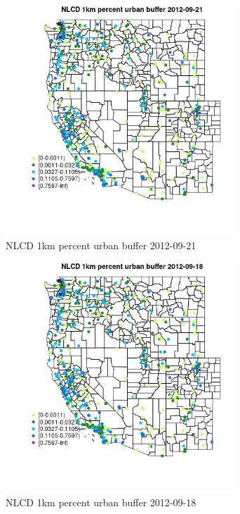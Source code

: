 \begin{figure} 
\centering  
\includegraphics[width=0.77\textwidth]{Code_Outputs/Report_ML_input_PM25_Step4_part_e_de_duplicated_aves_compiled_2019-05-14wNAs_MapObsNLCD_1km_percent_urban_buffer2012-09-21.jpg} 
\caption{\label{fig:Report_ML_input_PM25_Step4_part_e_de_duplicated_aves_compiled_2019-05-14wNAsMapObsNLCD_1km_percent_urban_buffer2012-09-21}NLCD 1km percent urban buffer 2012-09-21} 
\end{figure} 
 

\begin{figure} 
\centering  
\includegraphics[width=0.77\textwidth]{Code_Outputs/Report_ML_input_PM25_Step4_part_e_de_duplicated_aves_compiled_2019-05-14wNAs_MapObsNLCD_1km_percent_urban_buffer2012-09-18.jpg} 
\caption{\label{fig:Report_ML_input_PM25_Step4_part_e_de_duplicated_aves_compiled_2019-05-14wNAsMapObsNLCD_1km_percent_urban_buffer2012-09-18}NLCD 1km percent urban buffer 2012-09-18} 
\end{figure} 
 

